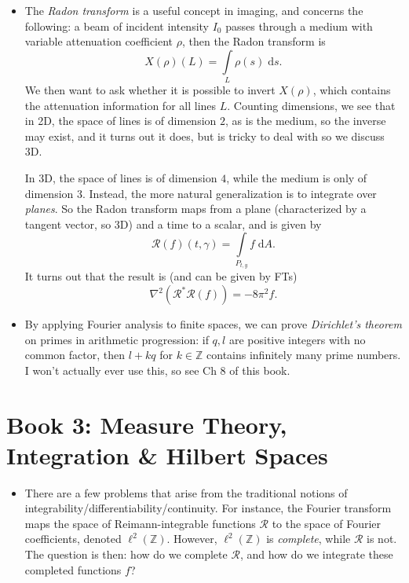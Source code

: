 \documentclass[11pt,
        usenames, %
        dvipsnames %
    ]{report}
\newcommand*{\p}[1]{\left(#1\right)}
\begin{document}
\begin{itemize}
    \item The \emph{Radon transform} is a useful concept in imaging, and
        concerns the following: a beam of incident intensity $I_0$ passes
        through a medium with variable attenuation coefficient $\rho$, then the
        Radon transform is
        \begin{equation}
            X(\rho)(L) = \int\limits_L \rho(s) \;\mathrm{d}s.
        \end{equation}
        We then want to ask whether it is possible to invert $X(\rho)$, which
        contains the attenuation information for all lines $L$. Counting
        dimensions, we see that in 2D, the space of lines is of dimension $2$,
        as is the medium, so the inverse may exist, and it turns out it does,
        but is tricky to deal with so we discuss 3D.

        In 3D, the space of lines is of dimension $4$, while the medium is only
        of dimension $3$. Instead, the more natural generalization is to
        integrate over \emph{planes}. So the Radon transform maps from a plane
        (characterized by a tangent vector, so 3D) and a time to a scalar, and
        is given by
        \begin{equation}
            \mathcal{R}(f)(t, \gamma) = \int\limits_{P_{t, y}}
                f\;\mathrm{d}A.
        \end{equation}
        It turns out that the result is (and can be given by FTs)
        \begin{equation}
            \nabla^2\p{\mathcal{R}^* \mathcal{R}(f)}
                = -8\pi^2 f.
        \end{equation}

    \item By applying Fourier analysis to finite spaces, we can prove
        \emph{Dirichlet's theorem} on primes in arithmetic progression: if $q,
        l$ are positive integers with no common factor, then $l + kq$ for $k \in
        \mathbb{Z}$ contains infinitely many prime numbers. I won't actually
        ever use this, so see Ch 8 of this book.
\end{itemize}

\section{Book 3: Measure Theory, Integration \& Hilbert Spaces}

\begin{itemize}
    \item There are a few problems that arise from the traditional notions of
        integrability/differentiability/continuity. For instance, the Fourier
        transform maps the space of Reimann-integrable functions $\mathcal{R}$ to
        the space of Fourier coefficients, denoted $\ell^2(\mathbb{Z})$.
        However, $\ell^2(\mathbb{Z})$ is \emph{complete}, while $\mathcal{R}$ is
        not. The question is then: how do we complete $\mathcal{R}$, and how do
        we integrate these completed functions $f$?
\end{itemize}
\end{document}
